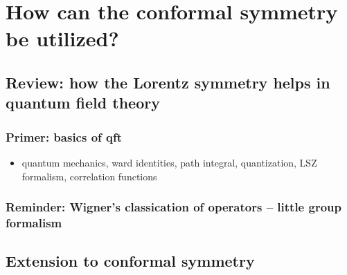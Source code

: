 \chapter{How can the conformal symmetry be utilized?}
\section{Review: how the Lorentz symmetry helps in quantum field theory}
\subsection{Primer: basics of qft}
\begin{itemize}
	\item quantum mechanics, ward identities, path integral, quantization,
	LSZ formalism, correlation functions
\end{itemize}
\subsection{Reminder: Wigner's classication of operators -- little group formalism}
\section{Extension to conformal symmetry}

